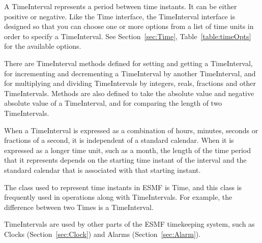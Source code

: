 
A TimeInterval represents a period between time instants.  
It can be either positive or negative.  Like the Time interface, 
the TimeInterval interface is designed so that you can choose 
one or more options from a list of time units in order 
to specify a TimeInterval.  See Section~\ref{sec:Time}, 
Table~\ref{table:timeOpts} for the available options.

There are TimeInterval methods defined for setting and getting 
a TimeInterval, for incrementing and decrementing a TimeInterval 
by another TimeInterval, and for multiplying and dividing 
TimeIntervals by integers, reals, fractions and other TimeIntervals.  
Methods are also defined to take the absolute value and negative 
absolute value of a TimeInterval, and for comparing the length of two
TimeIntervals.

When a TimeInterval is expressed as a combination of hours, 
minutes, seconds or fractions of a second, it is independent of a 
standard calendar.  When it is expressed as a longer time unit,
such as a month, the length of the time period that it represents 
depends on the starting time instant of the interval and the 
standard calendar that is associated with that starting instant.

The class used to represent time instants in ESMF is Time,
and this class is frequently used in operations along with 
TimeIntervals.  For example, the difference between two
Times is a TimeInterval.  

TimeIntervals are used by other parts of the ESMF timekeeping
system, such as Clocks (Section~\ref{sec:Clock}) and Alarms 
(Section~\ref{sec:Alarm}).






